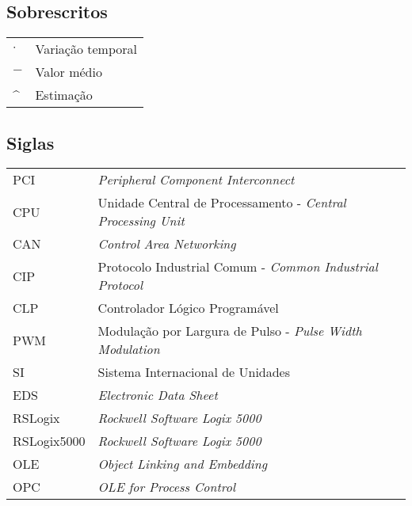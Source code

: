 \subsection*{Sobrescritos}

\begin{tabular}{p{}p{}}
$\cdot$  & Variação temporal \tabularnewline
$-$  & Valor médio \tabularnewline
\textasciicircum & Estimação \tabularnewline
\end{tabular}


\subsection*{Siglas}

\begin{tabular}{p{}p{}}
PCI  & \textit{Peripheral Component Interconnect}\tabularnewline
CPU & Unidade Central de Processamento - \textit{Central Processing Unit} \tabularnewline
CAN & \textit{Control Area Networking} \tabularnewline
CIP & Protocolo Industrial Comum - \textit{Common Industrial Protocol} \tabularnewline
CLP & Controlador Lógico Programável\tabularnewline
PWM &  Modulação por Largura de Pulso - \textit{Pulse Width Modulation}\tabularnewline
SI & Sistema Internacional de Unidades \tabularnewline
EDS & \textit{Electronic Data Sheet}
\tabularnewline
RSLogix & \textit{Rockwell Software Logix 5000}
\tabularnewline
RSLogix5000 & \textit{Rockwell Software Logix 5000}
\tabularnewline
OLE & \textit{Object Linking and Embedding}\tabularnewline
OPC & \textit{OLE for Process Control}\tabularnewline
\end{tabular}
